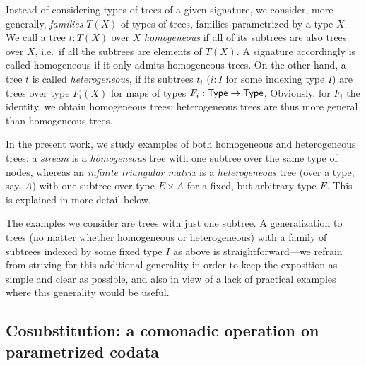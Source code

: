 \documentclass[a4paper,USenglish]{lipics}
\begin{document}
Instead of considering types of trees of a given signature, we consider, more generally, \emph{families} $T(X)$ of types of trees, families parametrized by a type $X$.
We call a tree $t:T(X)$ over $X$ \emph{homogeneous} if all of its subtrees are also trees over $X$, i.e.\, if all the subtrees are elements of $T(X)$.
A signature accordingly is called homogeneous if it only admits homogeneous trees.
On the other hand, a tree $t$ is called \emph{heterogeneous}, if its subtrees $t_i$ ($i : I$ for some indexing type $I$) are trees over 
type $F_i(X)$ for maps of types $F_i : \mathsf{Type} \to \mathsf{Type}$. Obviously, for $F_i$ the identity, we obtain homogeneous trees; heterogeneous trees are thus more general than
homogeneous trees.

In the present work, we study examples of both homogeneous and heterogeneous trees: a \emph{stream} is a \emph{homogeneous} tree with one subtree over the same type of nodes,
whereas an \emph{infinite triangular matrix} is a \emph{heterogeneous} tree (over a type, say, $A$) with one subtree over type $E\times A$ for a fixed, but arbitrary type $E$.
This is explained in more detail below.

The examples we consider are trees with just one subtree. A generalization to trees (no matter whether homogeneous or heterogeneous) with a family of subtrees indexed by some fixed type $I$ as above is straightforward---we refrain from striving for this additional generality in order to keep the exposition as simple and clear as possible, and also in view of a lack of practical examples where this generality would be useful.

 

 \subsection{Cosubstitution: a comonadic operation on parametrized codata}\label{sec:cosubst}
\end{document}

